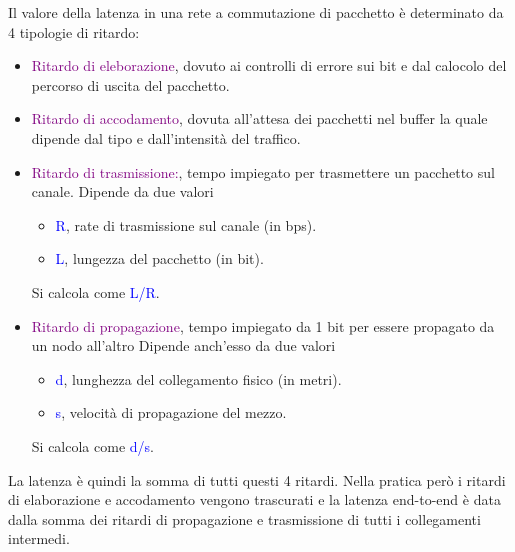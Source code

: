     Il valore della latenza in una rete a commutazione di pacchetto è determinato da 4 tipologie di ritardo:
    \begin{itemize}
        \item \textcolor{purple}{Ritardo di eleborazione}, dovuto ai controlli di errore sui bit e dal calocolo del percorso di uscita del pacchetto.
        \item \textcolor{purple}{Ritardo di accodamento}, dovuta all'attesa dei pacchetti nel buffer la quale dipende dal tipo e dall'intensità del traffico.
        \item \textcolor{purple}{Ritardo di trasmissione:}, tempo impiegato per trasmettere un pacchetto sul canale. 
        \newline Dipende da due valori
        \begin{itemize}
            \item \textcolor{blue}{R}, rate di trasmissione sul canale (in bps).
            \item \textcolor{blue}{L}, lungezza del pacchetto (in bit).
        \end{itemize}
        Si calcola come \textcolor{blue}{L/R}.
        \item \textcolor{purple}{Ritardo di propagazione}, tempo impiegato da 1 bit per essere propagato da un nodo all’altro
        \newline Dipende anch'esso da due valori
        \begin{itemize}
            \item \textcolor{blue}{d}, lunghezza del collegamento fisico (in metri).
            \item \textcolor{blue}{s}, velocità di propagazione del mezzo.
        \end{itemize}
        Si calcola come \textcolor{blue}{d/s}.
    \end{itemize}
    
    La latenza è quindi la somma di tutti questi 4 ritardi. Nella pratica però i ritardi di elaborazione e accodamento vengono trascurati e la latenza end-to-end è data dalla somma dei ritardi di propagazione e trasmissione di tutti i collegamenti intermedi.